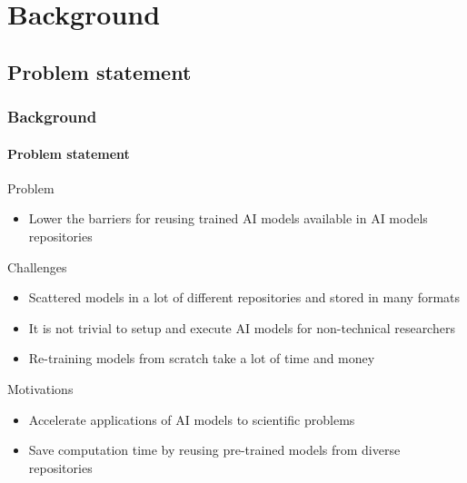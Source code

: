 \def\sectiontitle{Background}

\section{\sectiontitle}

\def\slidetitle{Problem statement}

\subsection{\slidetitle}
\begin{frame}
  \frametitle{\sectiontitle}
  \framesubtitle{\slidetitle}

  Problem
  \begin{itemize}
    \item Lower the barriers for reusing trained AI models available in AI models repositories
  \end{itemize}

  Challenges
  \begin{itemize}
    \item Scattered models in a lot of different repositories and stored in many formats
    \item It is not trivial to setup and execute AI models for non-technical researchers
    \item Re-training models from scratch take a lot of time and money
  \end{itemize}

  Motivations
  \begin{itemize}
    \item Accelerate applications of AI models to scientific problems
    \item Save computation time by reusing pre-trained models from diverse repositories
  \end{itemize}
\end{frame}

\def\slidetitle{Related work}

